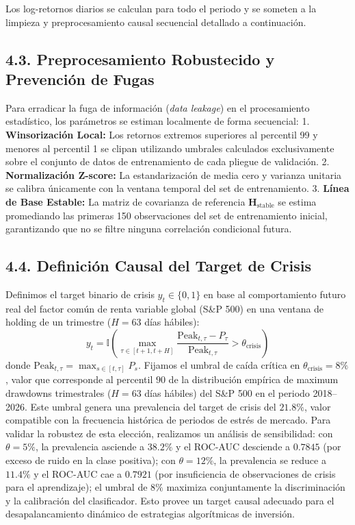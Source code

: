 \documentclass[
  12pt,
]{article}
\begin{document}
Los log-retornos diarios se calculan para todo el periodo y se someten a
la limpieza y preprocesamiento causal secuencial detallado a
continuación.

\subsection{4.3. Preprocesamiento Robustecido y Prevención de
Fugas}\label{preprocesamiento-robustecido-y-prevenciuxf3n-de-fugas}

Para erradicar la fuga de información (\emph{data leakage}) en el
procesamiento estadístico, los parámetros se estiman localmente de forma
secuencial: 1. \textbf{Winsorización Local:} Los retornos extremos
superiores al percentil 99 y menores al percentil 1 se clipan utilizando
umbrales calculados exclusivamente sobre el conjunto de datos de
entrenamiento de cada pliegue de validación. 2. \textbf{Normalización
Z-score:} La estandarización de media cero y varianza unitaria se
calibra únicamente con la ventana temporal del set de entrenamiento. 3.
\textbf{Línea de Base Estable:} La matriz de covarianza de referencia
\(\mathbf{H}_{\text{stable}}\) se estima promediando las primeras 150
observaciones del set de entrenamiento inicial, garantizando que no se
filtre ninguna correlación condicional futura.

\subsection{4.4. Definición Causal del Target de
Crisis}\label{definiciuxf3n-causal-del-target-de-crisis}

Definimos el target binario de crisis \(y_t \in \{0, 1\}\) en base al
comportamiento futuro real del factor común de renta variable global
(S\&P 500) en una ventana de holding de un trimestre (\(H=63\) días
hábiles):
\[y_t = \mathbb{I}\left( \max_{\tau \in [t+1, t+H]} \frac{\text{Peak}_{t,\tau} - P_{\tau}}{\text{Peak}_{t,\tau}} > \theta_{\text{crisis}} \right)\]
donde \(\text{Peak}_{t,\tau} = \max_{s \in [t, \tau]} P_s\). Fijamos el umbral de caída crítica en \(\theta_{\text{crisis}} = 8\%\), valor que corresponde al percentil \(90\) de la distribución empírica de maximum drawdowns trimestrales (\(H=63\) días hábiles) del S\&P 500 en el periodo 2018--2026. Este umbral genera una prevalencia del target de crisis del \(21.8\%\), valor compatible con la frecuencia histórica de periodos de estrés de mercado. Para validar la robustez de esta elección, realizamos un análisis de sensibilidad: con \(\theta = 5\%\), la prevalencia asciende a \(38.2\%\) y el ROC-AUC desciende a \(0.7845\) (por exceso de ruido en la clase positiva); con \(\theta = 12\%\), la prevalencia se reduce a \(11.4\%\) y el ROC-AUC cae a \(0.7921\) (por insuficiencia de observaciones de crisis para el aprendizaje); el umbral de \(8\%\) maximiza conjuntamente la discriminación y la calibración del clasificador. Esto provee un target causal adecuado para el desapalancamiento dinámico de estrategias algorítmicas de inversión.
\end{document}
